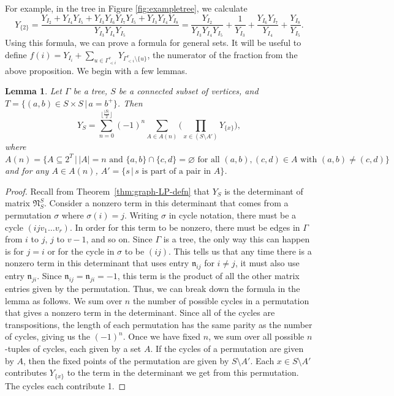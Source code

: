 \documentclass[10pt,a4paper]{amsart}
\numberwithin{equation}{section}
\newtheorem{Lemma}[Theorem]{Lemma}
\begin{document}
For example, in the tree in Figure \ref{fig:exampletree}, we calculate
\[
Y_{\{2\}} = \frac{Y_{I_2} + Y_{I_4}Y_{I_5} + Y_{I_3}Y_{I_6}Y_{I_7}Y_{I_5} + Y_{I_3}Y_{I_4}Y_{I_8}}{Y_{I_3}Y_{I_4}Y_{I_5}} = \frac{Y_{I_2}}{Y_{I_3}Y_{I_4}Y_{I_5}} + \frac{1}{Y_{I_3}} + \frac{Y_{I_6}Y_{I_7}}{Y_{I_4}} + \frac{Y_{I_8}}{Y_{I_5}}.
\]
Using this formula, we can prove a formula for general sets. It will be useful to define $f(i)=Y_{I_i}+\sum_{u\in\Gamma_{\lessdot i}^v}Y_{\Gamma_{< i}^v\setminus\{u\}}$, the numerator of the fraction from the above proposition. We begin with a few lemmas.
\begin{Lemma}\label{lem:Y-sum}
Let $\Gamma$ be a tree, $S$ be a connected subset of vertices, and $T=\{(a,b)\in S\times S\, |\, a=b^+\}$. Then
\[ Y_S=\sum_{n=0}^{\big\lfloor\frac{|S|}{2}\big\rfloor}(-1)^n\sum_{A\in A(n)}\bigg(\prod_{x\in (S\setminus A')}Y_{\{x\}}\bigg),\]
where $A(n)=\{A\subseteq 2^T\, |\, |A|=n\text{ and }\{a,b\}\cap\{c,d\}=\varnothing\text{ for all }(a,b),(c,d)\in A\text{ with }(a,b)\neq(c,d)\}$ and for any $A\in A(n)$, $A'=\{s\, |\, s\text{ is part of a pair in }A\}$.
\end{Lemma}
\begin{proof}
Recall from Theorem~\ref{thm:graph-LP-defn} that $Y_S$ is the determinant of matrix $\mathfrak{N}_S^S$. Consider a nonzero term in this determinant that comes from a permutation $\sigma$ where $\sigma(i)=j$. Writing $\sigma$ in cycle notation, there must be a cycle $(ijv_1\dots v_r)$. In order for this term to be nonzero, there must be edges in $\Gamma$ from $i$ to $j$, $j$ to $v-1$, and so on. Since $\Gamma$ is a tree, the only way this can happen is for $j=i$ or for the cycle in $\sigma$ to be $(ij)$. This tells us that any time there is a nonzero term in this determinant that uses entry $\mathfrak{n}_{ij}$ for $i\neq j$, it must also use entry $\mathfrak{n}_{ji}$. Since $\mathfrak{n}_{ij}=\mathfrak{n}_{ji}=-1$, this term is the product of all the other matrix entries given by the permutation.
Thus, we can break down the formula in the lemma as follows. We sum over $n$ the number of possible cycles in a permutation that gives a nonzero term in the determinant. Since all of the cycles are transpositions, the length of each permutation has the same parity as the number of cycles, giving us the $(-1)^n$. Once we have fixed $n$, we sum over all possible $n$-tuples of cycles, each given by a set $A$. If the cycles of a permutation are given by $A$, then the fixed points of the permutation are given by $S\setminus A'$. Each $x\in S\setminus A'$ contributes $Y_{\{x\}}$ to the term in the determinant we get from this permutation. The cycles each contribute 1.
\end{proof}
\end{document}
